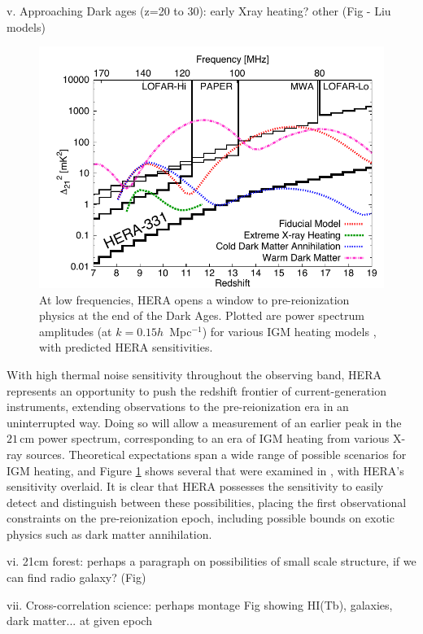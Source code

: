 \documentclass[preprint]{aastex}
\begin{document}
v. Approaching Dark ages (z=20 to 30): early Xray heating? other (Fig - Liu models)
\begin{figure}[t]\centering
\includegraphics{plots/Xray/HERA_II_compare_kp1_whoriz_20pt.pdf} 
\caption{\small 
At low frequencies, HERA opens a window to
pre-reionization physics at the end of the Dark Ages. Plotted are power spectrum amplitudes (at $k =
0.15h$~Mpc$^{-1}$) for various IGM heating models \citep{mesinger_et_al2013},
with predicted HERA sensitivities.
}\label{fig:Xray} \end{figure}

With high thermal noise sensitivity throughout the observing band, HERA represents an opportunity to push the redshift frontier of current-generation instruments, extending observations to the pre-reionization era in an uninterrupted way.  Doing so will allow a measurement of an earlier peak in the $21\,\textrm{cm}$ power spectrum, corresponding to an era of IGM heating from various X-ray sources.  Theoretical expectations span a wide range of possible scenarios for IGM heating, and Figure \ref{fig:Xray} shows several that were examined in \cite{mesinger_et_al2013}, with HERA's sensitivity overlaid.  It is clear that HERA possesses the sensitivity to easily detect and distinguish between these possibilities, placing the first observational constraints on the pre-reionization epoch, including possible bounds on exotic physics such as dark matter annihilation.


vi. 21cm forest: perhaps a paragraph on possibilities of small scale structure, if we can find radio galaxy? (Fig) 

vii. Cross-correlation science: perhaps montage Fig showing HI(Tb), galaxies, dark matter... at given epoch
\cite{lidz11}
\end{document}

